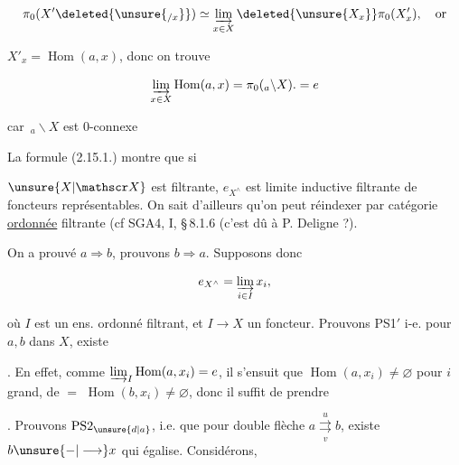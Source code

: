 \[
\pi_0(X'\deleted{\unsure{_{/x}}})\simeq\varinjlim_{x\in X}\deleted{\unsure{X_x}}\pi_0(X'_x),\quad\text{or}
\]

$X'_x=\operatorname{Hom}(a,x)$, donc on trouve

\[
\varinjlim_{x\in X}\operatorname{Hom}(a,x)=\pi_0({}_{a}\backslash X).=e
\]

car $\,{}_{a}\backslash X$ est $0$-connexe

La formule (2.15.1.) montre que si


$\unsure{X|\mathscr X}$ est filtrante, $e_{X^\wedge}$ est limite inductive filtrante de foncteurs représentables. On sait d'ailleurs qu'on peut réindexer par  catégorie \uline{ordonnée} filtrante (cf SGA4, I, \S\,8.1.6 (c'est dû à P. Deligne ?).

On a prouvé $a\Longrightarrow b$, prouvons $b\Longrightarrow a$. Supposons donc

\[
e_{X^\wedge}=\varinjlim_{i\in I}x_i,
\]

où $I$ est un  ens. ordonné filtrant, et $I\longrightarrow X$ un foncteur.  Prouvons PS1$'$  i-e. pour $a,b$ dans $X$, existe


. En effet,  comme  $\varinjlim_I\operatorname{Hom}(a,x_i)=e$, il s'ensuit que $\operatorname{Hom}(a,x_i)\ne\varnothing$ pour $i$ grand, de $=$ $\operatorname{Hom}(b,x_i)\ne\varnothing$, donc il suffit de prendre


. Prouvons $\mathrm{PS2}_{\unsure{d|a}}$, i.e. que pour double flèche $a\overset{u}{\underset{v}{\rightrightarrows}}b$, existe $b\unsure{\mathbin{-}|\longrightarrow}x$ qui égalise. Considérons,



